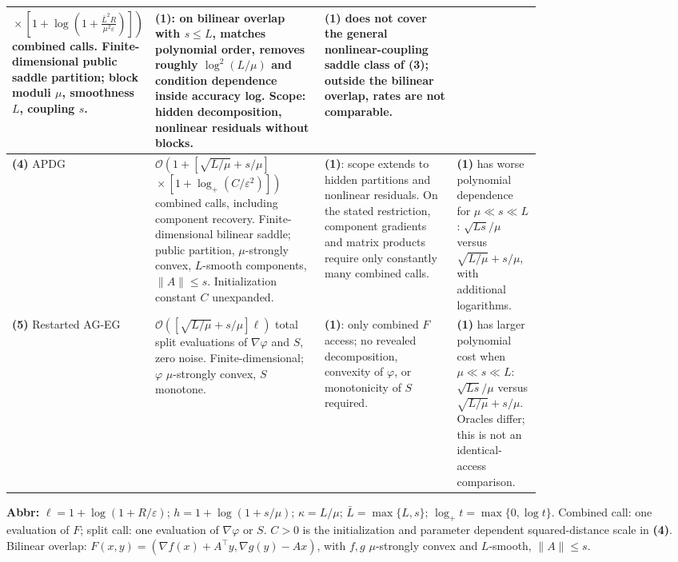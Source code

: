 \begin{table}[tp]
\begin{threeparttable}
\begin{tabularx}{\linewidth}{@{}>{\raggedright\arraybackslash}p{0.20\linewidth}>{\raggedright\arraybackslash}p{0.32\linewidth}>{\raggedright\arraybackslash}p{0.25\linewidth}>{\raggedright\arraybackslash}X@{}}
$\displaystyle\left.{}\times\left[1+\log\!\left(1+\frac{\bar L^2R}{\mu^2\varepsilon}\right)\right]\right)$ combined calls. Finite-dimensional public saddle partition; block moduli $\mu$, smoothness $L$, coupling $s$.
& \textbf{(1)}: on bilinear overlap with $s\le L$, matches polynomial order, removes roughly $\log^2(L/\mu)$ and condition dependence inside accuracy log. Scope: hidden decomposition, nonlinear residuals without blocks.
& \textbf{(1)} does not cover the general nonlinear-coupling saddle class of \textbf{(3)}; outside the bilinear overlap, rates are not comparable. \\
\midrule
\textbf{(4)} APDG \citep[Thm.~4.2, Sec.~5.1]{hpKovalev2022v2}
& $\displaystyle\mathcal{O}\!\left(1+\left[\sqrt{L/\mu}+s/\mu\right]\right.$\newline
$\displaystyle\left.{}\times[1+\log_+(C/\varepsilon^2)]\right)$ combined calls, including component recovery. Finite-dimensional bilinear saddle; public partition, $\mu$-strongly convex, $L$-smooth components, $\|A\|\le s$. Initialization constant $C$ unexpanded.
& \textbf{(1)}: scope extends to hidden partitions and nonlinear residuals. On the stated restriction, component gradients and matrix products require only constantly many combined calls.
& \textbf{(1)} has worse polynomial dependence for $\mu\ll s\ll L$: $\sqrt{Ls}/\mu$ versus $\sqrt{L/\mu}+s/\mu$, with additional logarithms. \\
\midrule
\textbf{(5)} Restarted AG-EG \citep[Cor.~2.8]{hpYuan2023}
& $\displaystyle\mathcal{O}\!\left(\left[\sqrt{L/\mu}+s/\mu\right]\ell\right)$ total split evaluations of $\nabla\varphi$ and $S$, zero noise. Finite-dimensional; $\varphi$ $\mu$-strongly convex, $S$ monotone.
& \textbf{(1)}: only combined $F$ access; no revealed decomposition, convexity of $\varphi$, or monotonicity of $S$ required.
& \textbf{(1)} has larger polynomial cost when $\mu\ll s\ll L$: $\sqrt{Ls}/\mu$ versus $\sqrt{L/\mu}+s/\mu$. Oracles differ; this is not an identical-access comparison. \\
\bottomrule
\end{tabularx}
\begin{tablenotes}[flushleft]\footnotesize
\item[] \textbf{Abbr:} $\ell=1+\log(1+R/\varepsilon)$; $h=1+\log(1+s/\mu)$; $\kappa=L/\mu$; $\bar L=\max\{L,s\}$; $\log_+t=\max\{0,\log t\}$. Combined call: one evaluation of $F$; split call: one evaluation of $\nabla\varphi$ or $S$. $C>0$ is the initialization and parameter dependent squared-distance scale in \textbf{(4)}. Bilinear overlap: $F(x,y)=(\nabla f(x)+A^\top y,\nabla g(y)-Ax)$, with $f,g$ $\mu$-strongly convex and $L$-smooth, $\|A\|\le s$.
\end{tablenotes}
\end{threeparttable}
\end{table}
\clearpage
